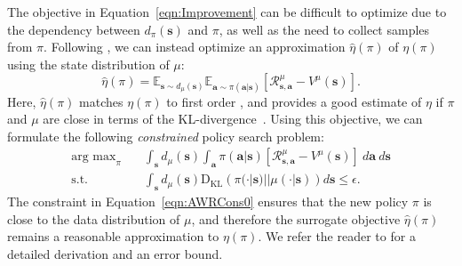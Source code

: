 \documentclass{article} \usepackage{iclr2020_conference,times}
\def\rva{{\mathbf{a}}}
\def\rvs{{\mathbf{s}}}
\newcommand{\expec}{\mathbb{E}}
\begin{document}
The objective in Equation~\ref{eqn:Improvement} can be difficult to optimize due to the dependency between $d_\pi(\rvs)$ and $\pi$, as well as the need to collect samples from $\pi$.
Following \citet{TRPOschulman15}, we can instead optimize an approximation $\hat{\eta}(\pi)$ of $\eta(\pi)$ using the state distribution of $\mu$:
\begin{equation}
    \hat{\eta}(\pi) = \expec_{\rvs \sim d_\mu(\rvs)} \expec_{\rva \sim \pi(\rva | \rvs)} \left[\mathcal{R}_{\rvs,\rva}^\mu - V^\mu(\rvs)\right]. \label{eqn:ApproxImprovement}
\end{equation}
Here, $\hat{\eta}(\pi)$ matches $\eta(\pi)$ to first order \citep{Kakade2002}, and provides a good estimate of $\eta$ if $\pi$ and $\mu$ are close in terms of the KL-divergence~\citep{TRPOschulman15}. Using this objective, we can formulate the following \emph{constrained} policy search problem:
\begin{align}
    \mathop{\mathrm{arg \ max}}_{\pi} \quad & \int_\rvs d_\mu(\rvs) \int_\rva \pi(\rva | \rvs) \left[\mathcal{R}_{\rvs,\rva}^\mu - V^\mu(\rvs)\right] \ d\rva \ d\rvs \\
    \textrm{s.t.} \quad & \int_\rvs d_\mu(\rvs) \mathrm{D_{KL}} \left( \pi(\cdot |\rvs) || \mu(\cdot |\rvs) \right) d\rvs \leq \epsilon . \label{eqn:AWRCons0}
\end{align}
The constraint in Equation~\ref{eqn:AWRCons0} ensures that the new policy $\pi$ is close to the data distribution of $\mu$, and therefore the surrogate objective  $\hat{\eta}(\pi)$ remains a reasonable approximation to $\eta(\pi)$. We refer the reader to \citet{TRPOschulman15} for a detailed derivation and an error bound.
\end{document}
